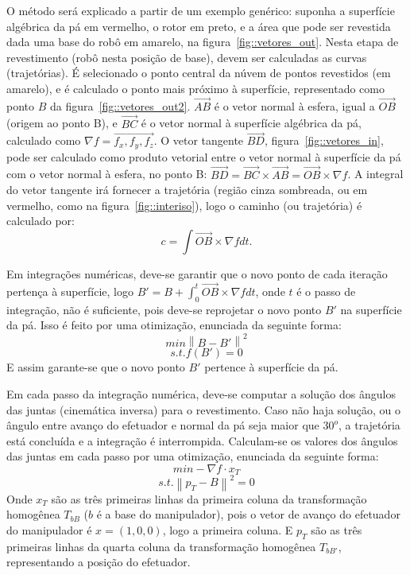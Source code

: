 O método será explicado a partir de um exemplo genérico: suponha a superfície
algébrica da pá em vermelho, o rotor em preto, e a área que pode ser
revestida dada uma base do robô em amarelo, na figura~\ref{fig::vetores_out}.
Nesta etapa de revestimento (robô nesta posição de base), devem ser calculadas
as curvas (trajetórias). É selecionado o ponto central da núvem de
pontos revestidos (em amarelo), e é calculado o ponto mais próximo à superfície,
representado como ponto $B$ da figura~\ref{fig::vetores_out2}.
$\vec{AB}$ é o vetor normal à esfera, igual a $\vec{OB}$ (origem ao ponto B), e $\vec{BC}$ é o vetor normal à superfície
algébrica da pá, calculado como $\nabla{f} = \vec{f_x,f_y,f_z}$. O vetor
tangente $\vec{BD}$, figura~\ref{fig::vetores_in}, pode ser calculado como
produto vetorial entre o vetor normal à superfície da pá com o vetor normal à
esfera, no ponto B: $\vec{BD} = \vec{BC} \times \vec{AB} = \vec{OB} \times
\nabla{f}$. A integral do vetor tangente irá fornecer a trajetória (região
cinza sombreada, ou em vermelho, como na figura~\ref{fig::interiso}), logo o
caminho (ou trajetória) é calculado por:
$$c = \int \vec{OB} \times \nabla{f} dt.$$ 

Em integrações numéricas, deve-se garantir que o novo ponto de cada iteração
pertença à superfície, logo $B' = B + \int_0^t \vec{OB} \times \nabla{f} dt$, onde $t$ é o passo de integração, não é
suficiente, pois deve-se reprojetar o novo ponto $B'$ na superfície da pá. Isso
é feito por uma otimização, enunciada da seguinte forma:
$$min \left \| B-B' \right \|^2$$
$$s.t. f(B')=0$$
E assim garante-se que o novo ponto $B'$ pertence à superfície da pá.

Em cada passo da integração numérica, deve-se computar a solução dos ângulos das
juntas (cinemática inversa) para o revestimento. Caso não haja solução, ou o
ângulo entre avanço do efetuador e normal da pá seja maior que $30^o$, a trajetória está
concluída e a integração é interrompida. Calculam-se os valores dos ângulos das
juntas em cada passo por uma otimização, enunciada da seguinte forma:
$$min -\nabla{f}\cdot x_T$$
$$s.t. \left \| p_T-B \right \|^2=0$$
Onde $x_T$ são as três primeiras linhas da primeira coluna da transformação
homogênea $T_{bB}$ ($b$ é a base do manipulador), pois o vetor de avanço do
efetuador do manipulador é $x=(1,0,0)$, logo a primeira coluna. E $p_T$ são as
três primeiras linhas da quarta coluna da transformação
homogênea $T_{bB'}$, representando a posição do efetuador.

